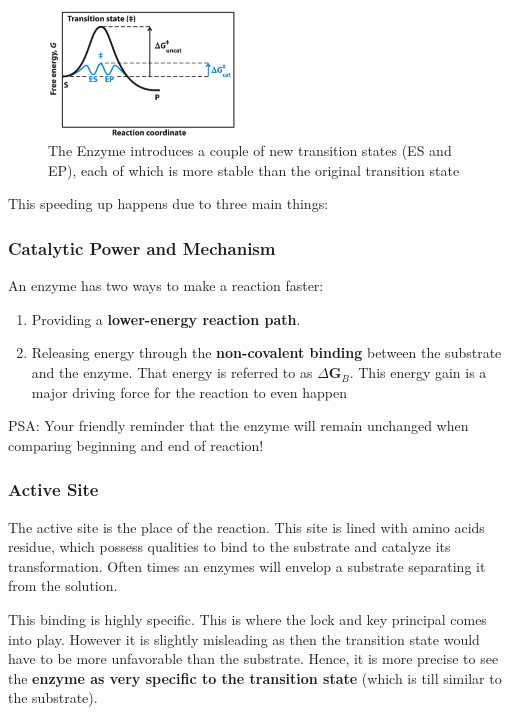 \documentclass[../main.tex]{subfiles}
\begin{document}
\begin{figure}[h]
	\centering
	\includegraphics[width=0.45\textwidth]{Enzyme_RD}
	\caption{The Enzyme introduces a couple of new transition states (ES and EP), each of which is more stable than the original transition state}
\end{figure}

This speeding up happens due to three main things:

\subsubsection{\gls{Catalytic Power} and Mechanism}
An enzyme has two ways to make a reaction faster:
\begin{enumerate}
	\item Providing a \textbf{lower-energy reaction path}.
	\item Releasing energy through the \textbf{non-covalent binding} between the substrate and the enzyme. That energy is referred to as \textbf{$\Delta$G$_{B}$}. This energy gain is a major driving force for the reaction to even happen
\end{enumerate}

PSA: Your friendly reminder that the enzyme will remain unchanged when comparing beginning and end of reaction!

\subsubsection{\gls{Active Site}}

The active site is the place of the reaction. This site is lined with amino acids residue, which possess qualities to bind to the substrate and catalyze its transformation. Often times an enzymes will envelop a  substrate separating it from the solution.

This binding is highly specific. This is where the lock and key principal comes into play. However it is slightly misleading as then the transition state would have to be more unfavorable than the  substrate. Hence, it is more precise to see the \textbf{enzyme as very specific to the transition state} (which is till similar to the substrate).
\end{document}
